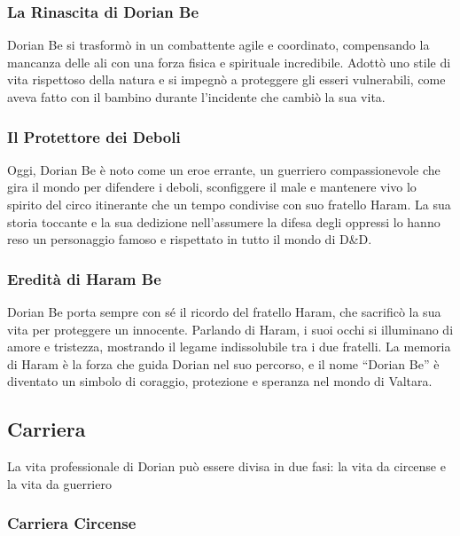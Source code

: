\subsubsection{La Rinascita di Dorian Be}
Dorian Be si trasformò in un combattente agile e coordinato, compensando
la mancanza delle ali con una forza fisica e spirituale incredibile.
Adottò uno stile di vita rispettoso della natura e si impegnò a
proteggere gli esseri vulnerabili, come aveva fatto con il bambino
durante l'incidente che cambiò la sua vita.

\subsubsection{Il Protettore dei Deboli}
Oggi, Dorian Be è noto come un eroe errante, un guerriero
compassionevole che gira il mondo per difendere i deboli, sconfiggere il
male e mantenere vivo lo spirito del circo itinerante che un tempo
condivise con suo fratello Haram. La sua storia toccante e la sua
dedizione nell'assumere la difesa degli oppressi lo hanno reso un
personaggio famoso e rispettato in tutto il mondo di D\&D.

\subsubsection{Eredità di Haram Be}
Dorian Be porta sempre con sé il ricordo del fratello Haram, che
sacrificò la sua vita per proteggere un innocente. Parlando di Haram, i
suoi occhi si illuminano di amore e tristezza, mostrando il legame
indissolubile tra i due fratelli. La memoria di Haram è la forza che
guida Dorian nel suo percorso, e il nome ``Dorian Be'' è diventato un
simbolo di coraggio, protezione e speranza nel mondo di Valtara.

\subsection{Carriera}\label{carriera}


La vita professionale di Dorian può essere divisa in due fasi: la vita
da circense e la vita da guerriero

\subsubsection{Carriera Circense}\label{carriera-circense}

